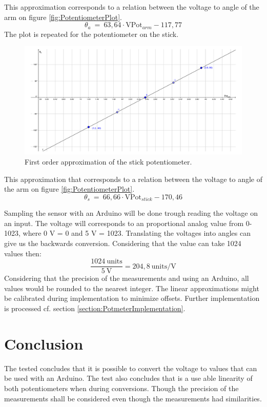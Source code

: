This approximation corresponds to a relation between the voltage to angle of the arm on figure \ref{fig:PotentiometerPlot}.
\begin{equation}
\theta_a\ =\ 63,64 \cdot \text{VPot}_{arm} - 117,77
\end{equation}
\newpage
The plot is repeated for the potentiometer on the stick.
\begin{figure}[htbp]  
\hspace*{-3cm}
\centering
\includegraphics[width=0.95\paperwidth]{figures/appendix/PotentiometerPlotStick.pdf}
\caption{First order approximation of the stick potentiometer.}
\label{fig:PotentiometerPlotStick}
\end{figure}

This approximation that corresponds to a relation between the voltage to angle of the arm on figure \ref{fig:PotentiometerPlot}.
\begin{equation}
\theta_s\ =\ 66,66 \cdot \text{VPot}_{stick} - 170,46
\end{equation}

Sampling the sensor with an Arduino will be done trough reading the voltage on an input. The voltage will corresponds to an proportional analog value from 0-1023, where 0 V = 0 and 5 V = 1023. Translating the voltages into angles can give us the backwards conversion. Considering that the value can take 1024 values then:
\begin{equation}
\dfrac{1024\ \text{units}}{5\ \text{V}} = 204,8\ \text{units/V}
\end{equation}     
Considering that the precision of the measurements and using an Arduino, all values would be rounded to the nearest integer.
The linear approximations might be calibrated during implementation to minimize offsets.
Further implementation is processed cf. section \ref{section:PotmeterImplementation}.

\section*{Conclusion}
The tested concludes that it is possible to convert the voltage to values that can be used with an Arduino. The test also concludes that is a use able linearity of both potentiometers when during conversions. Though the precision of the measurements shall be considered even though the measurements had similarities. 

